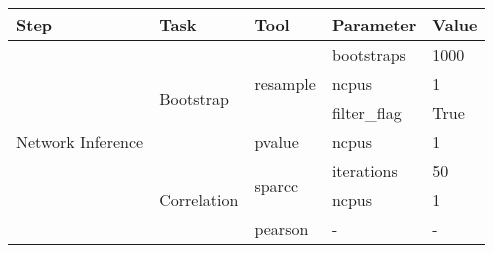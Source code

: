 \begin{table}[H]
\centering
\small
\begin{tabular}{lllll}
\hline
\textbf{Step}                             & \textbf{Task}                                            & \textbf{Tool}                          & \textbf{Parameter}                     & \textbf{Value}                                                                                           \\ \hline
\multirow{17}{*}{Network Inference}       & \multirow{4}{*}{Bootstrap}                               & \multirow{3}{*}{resample}              & bootstraps                             & 1000                                                                                                     \\
                                          &                                                          &                                        & ncpus                                  & 1                                                                                                        \\
                                          &                                                          &                                        & filter\_flag                           & True                                                                                                     \\
                                          &                                                          & pvalue                                 & ncpus                                  & 1                                                                                                        \\ \cline{2-5}
                                          & \multirow{12}{*}{Correlation}                            & \multirow{2}{*}{sparcc}                & iterations                             & 50                                                                                                       \\
                                          &                                                          &                                        & ncpus                                  & 1                                                                                                        \\
                                          &                                                          & pearson                                & -                                      & -                                                                                                        \\

\end{tabular}
\end{table}
